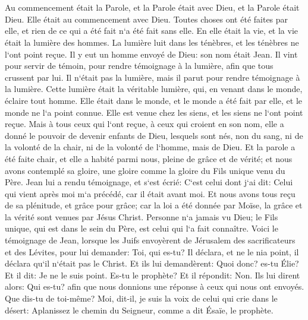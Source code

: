 

\chapter{}

\verse Au commencement était la Parole, et la Parole était avec Dieu, et la Parole était Dieu. 
\verse Elle était au commencement avec Dieu. 
\verse Toutes choses ont été faites par elle, et rien de ce qui a été fait n`a été fait sans elle. 
\verse En elle était la vie, et la vie était la lumière des hommes. 
\verse La lumière luit dans les ténèbres, et les ténèbres ne l`ont point reçue. 
\verse Il y eut un homme envoyé de Dieu: son nom était Jean. 
\verse Il vint pour servir de témoin, pour rendre témoignage à la lumière, afin que tous crussent par lui. 
\verse Il n`était pas la lumière, mais il parut pour rendre témoignage à la lumière. 
\verse Cette lumière était la véritable lumière, qui, en venant dans le monde, éclaire tout homme. 
\verse Elle était dans le monde, et le monde a été fait par elle, et le monde ne l`a point connue. 
\verse Elle est venue chez les siens, et les siens ne l`ont point reçue. 
\verse Mais à tous ceux qui l`ont reçue, à ceux qui croient en son nom, elle a donné le pouvoir de devenir enfants de Dieu, lesquels sont nés, 
\verse non du sang, ni de la volonté de la chair, ni de la volonté de l`homme, mais de Dieu. 
\verse Et la parole a été faite chair, et elle a habité parmi nous, pleine de grâce et de vérité; et nous avons contemplé sa gloire, une gloire comme la gloire du Fils unique venu du Père. 
\verse Jean lui a rendu témoignage, et s`est écrié: C`est celui dont j`ai dit: Celui qui vient après moi m`a précédé, car il était avant moi. 
\verse Et nous avons tous reçu de sa plénitude, et grâce pour grâce; 
\verse car la loi a été donnée par Moïse, la grâce et la vérité sont venues par Jésus Christ. 
\verse Personne n`a jamais vu Dieu; le Fils unique, qui est dans le sein du Père, est celui qui l`a fait connaître. 
\verse Voici le témoignage de Jean, lorsque les Juifs envoyèrent de Jérusalem des sacrificateurs et des Lévites, pour lui demander: Toi, qui es-tu? 
\verse Il déclara, et ne le nia point, il déclara qu`il n`était pas le Christ. 
\verse Et ils lui demandèrent: Quoi donc? es-tu Élie? Et il dit: Je ne le suis point. Es-tu le prophète? Et il répondit: Non. 
\verse Ils lui dirent alors: Qui es-tu? afin que nous donnions une réponse à ceux qui nous ont envoyés. Que dis-tu de toi-même? 
\verse Moi, dit-il, je suis la voix de celui qui crie dans le désert: Aplanissez le chemin du Seigneur, comme a dit Ésaïe, le prophète. 
